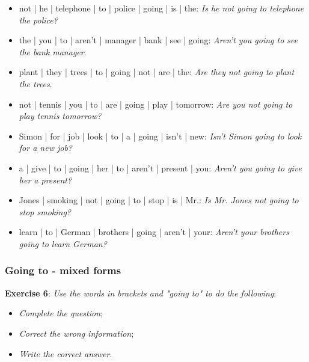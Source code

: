 \begin{itemize}

\item not | he | telephone | to | police | going | is | the: \textit{Is he not going to telephone the police?}
\item the | you | to | aren't | manager | bank | see | going: \textit{Aren't you going to see the bank manager}.
\item plant | they | trees | to | going | not | are | the: \textit{Are they not going to plant the trees}.
\item not | tennis | you | to | are | going | play | tomorrow: \textit{Are you not going to play tennis tomorrow?}
\item Simon | for | job | look | to | a | going | isn't | new: \textit{Isn't Simon going to look for a new job?}
\item a | give | to | going | her | to | aren't | present | you: \textit{Aren't you going to give her a present?}
\item Jones | smoking | not | going | to | stop | is | Mr.: \textit{Is Mr. Jones not going to stop smoking?}
\item learn | to | German | brothers | going | aren't | your: \textit{Aren't your brothers going to learn German?}

\end{itemize}

\subsubsection{Going to - mixed forms}

\textbf{Exercise 6}: \textit{Use the words in brackets and "going to" to do the following}:

\begin{itemize}

\item \textit{Complete the question};
\item \textit{Correct the wrong information};
\item \textit{Write the correct answer}.

\end{itemize}

